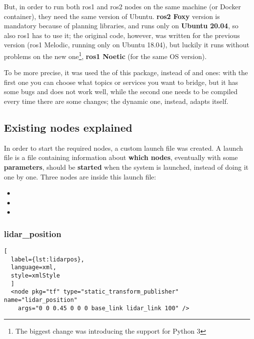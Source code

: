 But, in order to run both \acrshort{ros}1 and \acrshort{ros}2 nodes on the same machine (or Docker container), they need the same version of Ubuntu. \textbf{\acrshort{ros}2 Foxy} version is mandatory because of planning libraries, and runs only on \textbf{Ubuntu 20.04}, so also \acrshort{ros}1 has to use it; the original code, however, was written for the previous version (\acrshort{ros}1 Melodic, running only on Ubuntu 18.04), but luckily it runs without problems on the new one\footnote{The biggest change was introducing the support for Python 3}, \textbf{\acrshort{ros}1 Noetic} (for the same OS version).

To be more precise, it was used the  of this package, instead of  and  ones: with the first one you can choose what topics or services you want to bridge, but it has some bugs and does not work well, while the second one needs to be compiled every time there are some changes; the dynamic one, instead, adapts itself.

\subsection{Existing nodes explained}
\label{subsec:nodes}

In order to start the required nodes, a custom launch file was created. A launch file is a file containing information about \textbf{which nodes}, eventually with some \textbf{parameters}, should be \textbf{started} when the system is launched, instead of doing it one by one. Three nodes are inside this launch file:

\begin{itemize}
    \item {}
    \item {}
    \item {}
\end{itemize}

\subsubsection{lidar\_position} %

\begin{lstlisting}[
  label={lst:lidarpos},
  language=xml,
  style=xmlStyle
  ]
  <node pkg="tf" type="static_transform_publisher" name="lidar_position"
    args="0 0 0.45 0 0 0 base_link lidar_link 100" />
\end{lstlisting}

